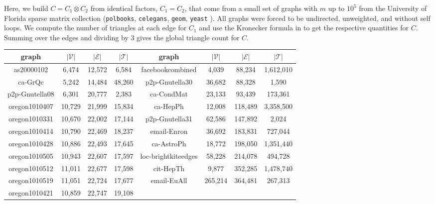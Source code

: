 \documentclass[10]{article}
\begin{document}
Here, we build $C = C_1 \otimes C_2$ from identical factors, $C_1=C_2$, that come from a small set of  graphs with $m$ up to $10^5$ from the University of Florida sparse matrix collection ({\tt polbooks}, {\tt celegans}, {\tt geom}, {\tt yeast} \cite{davis2011university}). 
All graphs were forced to be undirected, unweighted, and without self loops.  
We compute the number of triangles at each edge for $C_1$ and use the Kronecker formula in \cite{sanders2018large} to get the respective quantities for $C$.
Summing over the edges and dividing by 3 gives the global triangle count for $C$.




\begin{table}[htbp]
\begin{center}
\begin{tabular}{|c|c|c|c|c|c|c|c|}
\hline
\textbf{graph} & $|\mathcal{V}|$ & $|\mathcal{E}|$ & $|\mathcal{T}|$ & \textbf{graph} & $|\mathcal{V}|$ & $|\mathcal{E}|$ & $|\mathcal{T}|$  \\
\hline
\hline
as20000102 & 6,474 & 12,572 & 6,584 & 
facebookcombined & 4,039 & 88,234 & 1,612,010  \\
\hline
ca-GrQc & 5,242 & 14,484 & 48,260 & 
p2p-Gnutella30 & 36,682 & 88,328 & 1,590 \\
\hline
p2p-Gnutella08 & 6,301 & 20,777 & 2,383 & 
ca-CondMat & 23,133 & 93,439 & 173,361 \\
\hline
oregon1010407 & 10,729 & 21,999 & 15,834 & 
ca-HepPh & 12,008 & 118,489 & 3,358,500 \\
\hline
oregon1010331 &10,670 &  22,002 & 17,144 & 
p2p-Gnutella31 & 62,586 & 147,892 & 2,024 \\
\hline
oregon1010414 & 10,790 &  22,469 & 18,237 & 
email-Enron & 36,692 & 183,831 & 727,044 \\
\hline
oregon1010428 & 10,886 & 22,493 & 17,645 & 
ca-AstroPh & 18,772 & 198,050 & 1,351,440 \\
\hline
oregon1010505 & 10,943 & 22,607 & 17,597 & 
loc-brightkiteedges & 58,228 & 214,078 & 494,728 \\
\hline
oregon1010512 & 11,011 & 22,677 & 17,598 & 
cit-HepTh & 9,877 & 352,285 & 1,478,740 \\
\hline
oregon1010519 & 11,051 & 22,724 & 17,677 & 
email-EuAll & 265,214 & 364,481 & 267,313  \\
\hline
oregon1010421 & 10,859 & 22,747 & 19,108 & 

\end{tabular}
\end{center}
\end{table}
\end{document}
